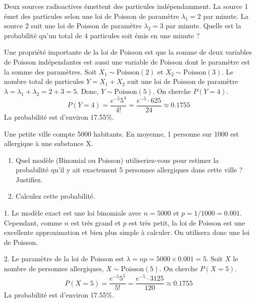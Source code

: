 \begin{exercicebox}
Deux sources radioactives émettent des particules indépendamment. La source 1 émet des particules selon une loi de Poisson de paramètre $\lambda_1=2$ par minute. La source 2 suit une loi de Poisson de paramètre $\lambda_2=3$ par minute. Quelle est la probabilité qu'un total de 4 particules soit émis en une minute ?
\end{exercicebox}

\begin{correctionbox}
Une propriété importante de la loi de Poisson est que la somme de deux variables de Poisson indépendantes est aussi une variable de Poisson dont le paramètre est la somme des paramètres.
Soit $X_1 \sim \text{Poisson}(2)$ et $X_2 \sim \text{Poisson}(3)$.
Le nombre total de particules $Y = X_1 + X_2$ suit une loi de Poisson de paramètre $\lambda = \lambda_1 + \lambda_2 = 2+3=5$.
Donc, $Y \sim \text{Poisson}(5)$.
On cherche $P(Y=4)$.
$$ P(Y=4) = \frac{e^{-5} 5^4}{4!} = \frac{e^{-5} \cdot 625}{24} \approx 0.1755 $$
La probabilité est d'environ 17.55\%.
\end{correctionbox}

\begin{exercicebox}
Une petite ville compte 5000 habitants. En moyenne, 1 personne sur 1000 est allergique à une substance X.
\begin{enumerate}
    \item Quel modèle (Binomial ou Poisson) utiliseriez-vous pour estimer la probabilité qu'il y ait exactement 5 personnes allergiques dans cette ville ? Justifiez.
    \item Calculez cette probabilité.
\end{enumerate}
\end{exercicebox}

\begin{correctionbox}
1. Le modèle exact est une loi binomiale avec $n=5000$ et $p=1/1000=0.001$. Cependant, comme $n$ est très grand et $p$ est très petit, la loi de Poisson est une excellente approximation et bien plus simple à calculer. On utilisera donc une loi de Poisson.

2. Le paramètre de la loi de Poisson est $\lambda = np = 5000 \times 0.001 = 5$.
Soit $X$ le nombre de personnes allergiques, $X \sim \text{Poisson}(5)$.
On cherche $P(X=5)$.
$$ P(X=5) = \frac{e^{-5} 5^5}{5!} = \frac{e^{-5} \cdot 3125}{120} \approx 0.1755 $$
La probabilité est d'environ 17.55\%.
\end{correctionbox}